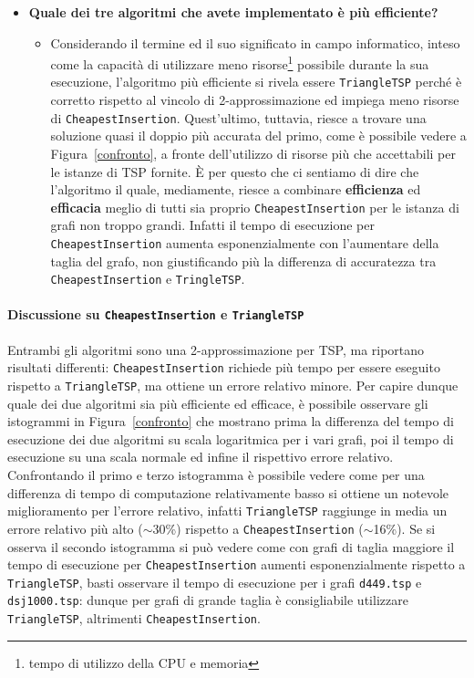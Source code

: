 \begin{itemize}
\begin{itemize}
	\end{itemize}
	\item \textbf{Quale dei tre algoritmi che avete implementato è più efficiente?}
	\begin{itemize}
		\item Considerando il termine  ed il suo significato in campo informatico, inteso come la capacità di utilizzare meno risorse\footnote{tempo di utilizzo della CPU e memoria} possibile durante la sua esecuzione, l'algoritmo più efficiente si rivela essere \texttt{TriangleTSP} perché è corretto rispetto al vincolo di 2-approssimazione ed impiega meno risorse di \texttt{CheapestInsertion}. Quest'ultimo, tuttavia, riesce a trovare una soluzione quasi il doppio più accurata del primo, come è possibile vedere a Figura~\ref{confronto}, a fronte dell'utilizzo di risorse più che accettabili per le istanze di TSP fornite. \`{E} per questo che ci sentiamo di dire che l'algoritmo il quale, mediamente, riesce a combinare \textbf{efficienza} ed \textbf{efficacia} meglio di tutti sia proprio \texttt{CheapestInsertion} per le istanza di grafi non troppo grandi. Infatti il tempo di esecuzione per \texttt{CheapestInsertion} aumenta esponenzialmente con l'aumentare della taglia del grafo, non giustificando più la differenza di accuratezza tra \texttt{CheapestInsertion} e \texttt{TringleTSP}.
	\end{itemize}
\end{itemize}


\paragraph{Discussione su \texttt{CheapestInsertion} e \texttt{TriangleTSP}} \label{ci-ttsp}
Entrambi gli algoritmi sono una 2-approssimazione per TSP, ma riportano risultati differenti: \texttt{CheapestInsertion} richiede più tempo per essere eseguito rispetto a \texttt{TriangleTSP}, ma ottiene un errore relativo minore.\eqcapo 
Per capire dunque quale dei due algoritmi sia più efficiente ed efficace, è possibile osservare gli istogrammi in Figura~\ref{confronto} che mostrano prima la differenza del tempo di esecuzione dei due algoritmi su scala logaritmica per i vari grafi, poi il tempo di esecuzione su una scala normale ed infine il rispettivo errore relativo. Confrontando il primo e terzo istogramma è possibile vedere come per una differenza di tempo di computazione relativamente basso si ottiene un notevole miglioramento per l'errore relativo, infatti \texttt{TriangleTSP} raggiunge in media un errore relativo più alto ($\sim$30\%) rispetto a \texttt{CheapestInsertion} ($\sim$16\%). Se si osserva il secondo istogramma si può vedere come con grafi di taglia maggiore il tempo di esecuzione per \texttt{CheapestInsertion} aumenti esponenzialmente rispetto a \texttt{TriangleTSP}, basti osservare il tempo di esecuzione per i grafi \texttt{d449.tsp} e \texttt{dsj1000.tsp}: dunque per grafi di grande taglia è consigliabile utilizzare \texttt{TriangleTSP}, altrimenti \texttt{CheapestInsertion}.

